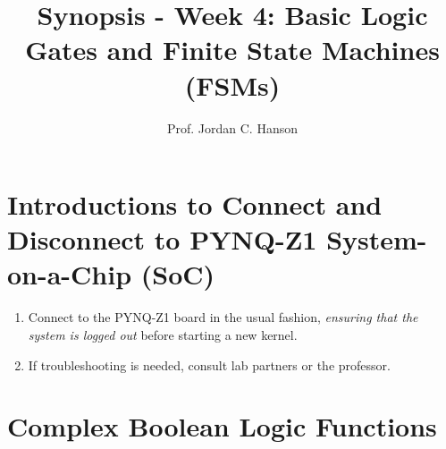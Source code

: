 \documentclass{article}
\begin{document}
\title{Synopsis - Week 4: Basic Logic Gates and Finite State Machines (FSMs)}
\author{Prof. Jordan C. Hanson}

\maketitle

\section{Introductions to Connect and Disconnect to PYNQ-Z1 System-on-a-Chip (SoC)}

\begin{enumerate}
\item Connect to the PYNQ-Z1 board in the usual fashion,\textit{ ensuring that the system is logged out} before starting a new kernel.
\item If troubleshooting is needed, consult lab partners or the professor.
\end{enumerate}

\section{Complex Boolean Logic Functions}
\end{document}

